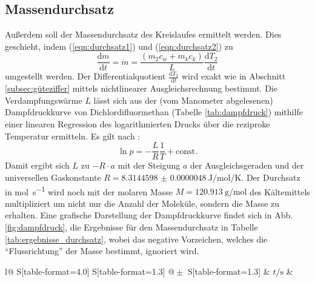 \subsection{Massendurchsatz}
  Außerdem soll der Massendurchsatz des Kreislaufes ermittelt werden. Dies geschieht, indem (\ref{eqn:durchsatz1}) und (\ref{eqn:durchsatz2}) zu
  \begin{equation}
    \frac{\mathrm{d}m}{\mathrm{d}t} = \dot m = \frac{(m_{2} c_w + m_k c_k)}{L}\frac {\mathrm{d}T_{2}}{\mathrm{d}t}
  \end{equation}
  umgestellt werden. Der Differentialquotient $\frac {\mathrm{d}T_{2}}{\mathrm{d}t}$ wird exakt wie in Abschnitt \ref{subsec:güteziffer} mittels nichtlinearer Ausgleichsrechnung bestimmt. Die Verdampfungswärme $L$ lässt sich aus der (vom Manometer abgelesenen) Dampfdruckkurve von Dichlordifluormethan (Tabelle \ref{tab:dampfdruck}) mithilfe einer linearen Regression des logarithmierten Drucks über die reziproke Temperatur ermitteln. Es gilt nach \cite{anleitung203}:
  \begin{equation}
    \ln p = -\frac{L}{R} \frac {1}{T} + \mathrm{const.}
  \end{equation}
  Damit ergibt sich $L$ zu $-R \cdot a$ mit der Steigung $a$ der Ausgleichsgeraden und der universellen Gaskonstante $R = \SI[separate-uncertainty=false]{8.3144598(48)}{\joule\per\mol\per\kelvin}$\cite{codata}. Der Durchsatz in \si{\mol\per\second} wird noch mit der molaren Masse $M = \SI{120.913}{\gram\per\mol}$\cite[267]{gase} des Kältemittels multipliziert um nicht nur die Anzahl der Moleküle, sondern die Masse zu erhalten. Eine grafische Darstellung der Dampfdruckkurve findet sich in Abb. \ref {fig:dampfdruck}, die Ergebnisse für den Massendurchsatz in Tabelle \ref{tab:ergebnisse_durchsatz}, wobei das negative Vorzeichen, welches die \enquote{Flussrichtung} der Masse bestimmt, ignoriert wird.

  \begin{table}[htbp]
    \centering
    \caption{Ermittelte Massendurchsätze.}
    \label{tab:ergebnisse_durchsatz}
    \begin{tabular}{
        l@{}
        S[table-format=4.0]
        S[table-format=1.3] @{${}\pm{}$} S[table-format=1.3]}
      \toprule
      & $t / \si{\second}$
      &  \\
      \midrule
      
      \bottomrule
    \end{tabular}
  \end{table}

